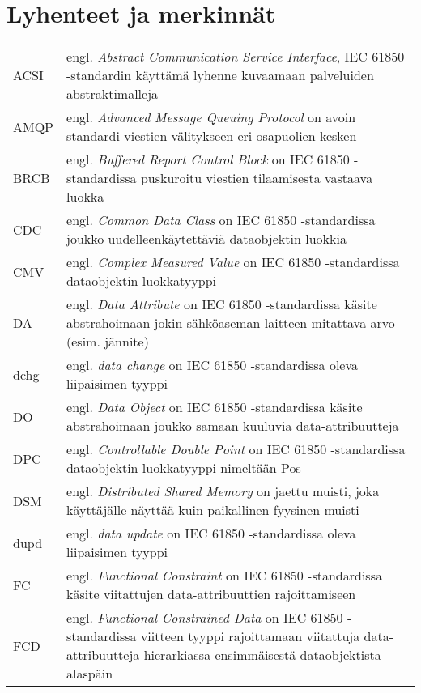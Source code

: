 \chapter*{Lyhenteet ja merkinnät}
\label{ch:lyhenteetjamerkinnat}
\begin{tabularx}{\linewidth}[h]{@{} p{} p{} @{}}
	ACSI & engl. \emph{Abstract Communication Service Interface}, IEC 61850 -standardin käyttämä lyhenne kuvaamaan palveluiden abstraktimalleja \\
	AMQP & engl. \emph{Advanced Message Queuing Protocol} on avoin standardi viestien välitykseen eri osapuolien kesken \\
	BRCB & engl. \emph{Buffered Report Control Block} on IEC 61850 -standardissa puskuroitu viestien tilaamisesta vastaava luokka \\
	CDC & engl. \emph{Common Data Class} on IEC 61850 -standardissa joukko uudelleenkäytettäviä dataobjektin luokkia \\
	CMV & engl. \emph{Complex Measured Value} on IEC 61850 -standardissa dataobjektin luokkatyyppi \\
	DA & engl. \emph{Data Attribute} on IEC 61850 -standardissa käsite abstrahoimaan jokin sähköaseman laitteen mitattava arvo (esim. jännite) \\
	dchg & engl. \emph{data change} on IEC 61850 -standardissa oleva liipaisimen tyyppi \\
	DO & engl. \emph{Data Object} on IEC 61850 -standardissa käsite abstrahoimaan joukko samaan kuuluvia data-attribuutteja \\
	DPC & engl. \emph{Controllable Double Point} on IEC 61850 -standardissa dataobjektin luokkatyyppi nimeltään Pos \\
	DSM & engl. \emph{Distributed Shared Memory} on jaettu muisti, joka käyttäjälle näyttää kuin paikallinen fyysinen muisti \\
	dupd & engl. \emph{data update} on IEC 61850 -standardissa oleva liipaisimen tyyppi \\
	FC & engl. \emph{Functional Constraint} on IEC 61850 -standardissa käsite viitattujen data-attribuuttien rajoittamiseen \\
	FCD & engl. \emph{Functional Constrained Data} on IEC 61850 -standardissa viitteen tyyppi rajoittamaan viitattuja data-attribuutteja hierarkiassa ensimmäisestä dataobjektista alaspäin \\

\end{tabularx}
